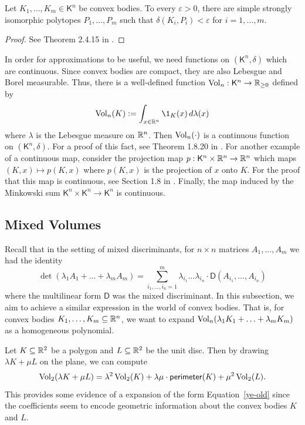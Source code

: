 \documentclass{puthesis-UG}
\begin{document}
\begin{thm} \label{approximation-SSI}
	Let $K_1, \ldots, K_m \in \mathsf{K}^n$ be convex bodies. To every $\varepsilon > 0$, there are simple strongly isomorphic polytopes $P_1, \ldots, P_m$ such that $\delta (K_i, P_i) < \varepsilon$ for $i = 1, \ldots, m$.
\end{thm}

\begin{proof}
	See Theorem 2.4.15 in \cite{schneider_2013}. 
\end{proof}

In order for approximations to be useful, we need functions on $(\mathsf{K}^n, \delta)$ which are continuous. Since convex bodies are compact, they are also Lebesgue and Borel measurable. Thus, there is a well-defined function $\operatorname{Vol}_n : \mathsf{K}^n \to \mathbb{R}_{\geq 0}$ defined by
\[
	\Vol_n (K) := \int_{x \in \RR^n} \1_K(x) \, d \lambda(x)
\]
where $\lambda$ is the Lebesgue measure on $\mathbb{R}^n$. Then $\operatorname{Vol}_n(\cdot)$ is a continuous function on $(\mathsf{K}^n, \delta)$. For a proof of this fact, see Theorem 1.8.20 in \cite{schneider_2013}. For another example of a continuous map, consider the projection map $p : \mathsf{K}^n \times \mathbb{R}^n \to \mathbb{R}^n$ which maps $(K, x) \mapsto p(K, x)$ where $p(K, x)$ is the projection of $x$ onto $K$. For the proof that this map is continuous, see Section 1.8 in \cite{schneider_2013}. Finally, the map induced by the Minkowski sum $\mathsf{K}^n \times \mathsf{K}^n \to \mathsf{K}^n$ is continuous. 


\subsection{Mixed Volumes}

Recall that in the setting of mixed discriminants, for $n \times n$ matrices $A_1, \ldots, A_m$ we had the identity
\begin{equation} \label{ye-old}
	\det (\lambda_1 A_1 + \ldots + \lambda_m A_m) = \sum_{i_1, \ldots, i_n = 1}^m \lambda_{i_1} \ldots \lambda_{i_n} \cdot \mathsf{D}(A_{i_1}, \ldots, A_{i_n})
\end{equation}
where the multilinear form $\mathsf{D}$ was the mixed discriminant. In this subsection, we aim to achieve a similar expression in the world of convex bodies. That is, for convex bodies $K_1, \ldots, K_m \subseteq \mathbb{R}^n$, we want to expand $\operatorname{Vol}_n(\lambda_1 K_1 + \ldots + \lambda_m K_m)$ as a homogeneous polynomial. 
\begin{example}
	Let $K \subseteq \mathbb{R}^2$ be a polygon and $L \subseteq \mathbb{R}^2$ be the unit disc. Then by drawing $\lambda K + \mu L$ on the plane, we can compute 
	\[
		\operatorname{Vol}_2 (\lambda K + \mu L) = \lambda^2 \operatorname{Vol}_2(K) + \lambda \mu \cdot \mathsf{perimeter}(K) + \mu^2 \operatorname{Vol}_2(L). 
	\]
	This provides some evidence of a expansion of the form Equation~\ref{ye-old} since the coefficients seem to encode geometric information about the convex bodies $K$ and $L$. 
\end{example}
\end{document}
